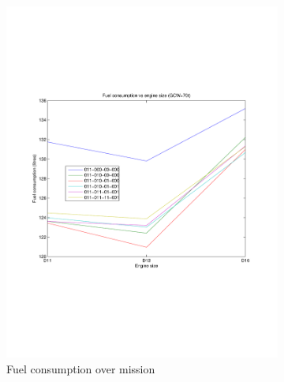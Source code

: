 \documentclass{article}
\begin{document}
\begin{figure}[h!]
\begin{subfigure}{.5\textwidth}
	\centering
	\includegraphics[width=\linewidth, clip=true, trim=45 185 65 208]{Figures/Increasing_number_of_axles/Fuel_consumption_vs_axle_number_and_engine_size.pdf}
	\caption{Fuel consumption over mission}
\end{subfigure}
\begin{subfigure}{.5\textwidth}
	\centering

\end{subfigure}
\end{figure}
\end{document}
